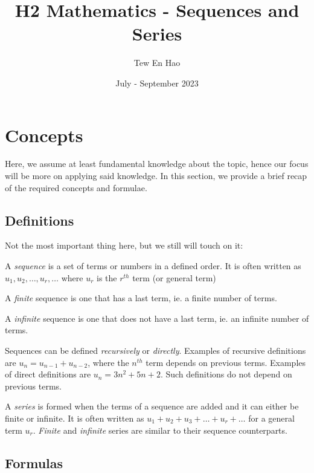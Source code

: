 \documentclass[12pt, a4paper, titlepage]{article}
\title{H2 Mathematics - Sequences and Series}
\author{Tew En Hao}
\date{July - September 2023}
\begin{document}
\maketitle

\newpage

\tableofcontents

\newpage

\section{Concepts}

Here, we assume at least fundamental knowledge about the topic, hence our focus will be more on applying said knowledge. In this section, we provide a brief recap of the required concepts and formulae.

\subsection{Definitions}

Not the most important thing here, but we still will touch on it:

\begin{outline}[enumerate]
    \1 A \emph{sequence} is a set of terms or numbers in a defined order. It is often written as $u_1, u_2, \dots, u_r, \dots$ where $u_r$ is the $r^{th}$ term (or general term)

        \2 A \emph{finite} sequence is one that has a last term, ie. a finite number of terms.

        \2 A \emph{infinite} sequence is one that does not have a last term, ie. an infinite number of terms.

        \2 Sequences can be defined \emph{recursively} or \emph{directly}. Examples of recursive definitions are $u_n = u_{n-1} + u_{n-2}$, where the $n^{th}$ term depends on previous terms. Examples of direct definitions are $u_n = 3n^2 + 5n + 2$. Such definitions do not depend on previous terms.

    \1 A \emph{series} is formed when the terms of a sequence are added and it can either be finite or infinite. It is often written as $u_1 + u_2 + u_3 + \dots + u_r + \dots$ for a general term $u_r$. \emph{Finite} and \emph{infinite} series are similar to their sequence counterparts.
\end{outline}

\subsection{Formulas}
\end{document}
